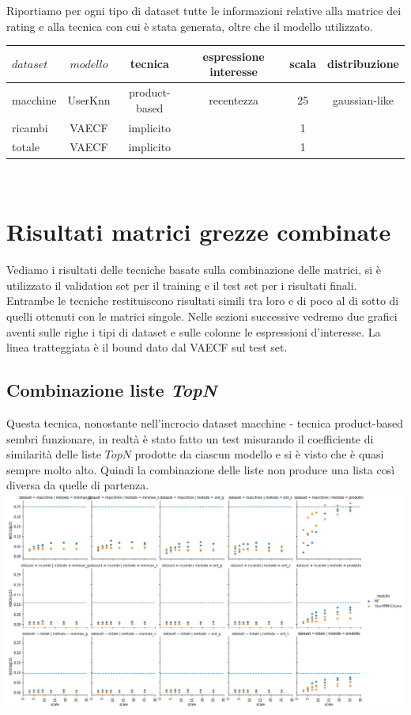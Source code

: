 Riportiamo per ogni tipo di dataset tutte le informazioni relative alla matrice dei rating e alla tecnica con cui è stata generata, oltre che il modello utilizzato.\\

\begin{tabular}{|l|ccccc|}
    \toprule
    $dataset$  & $modello$ & tecnica &espressione interesse & scala & distribuzione  \\
    \midrule
    macchine & UserKnn& product-based &recentezza & 25 & gaussian-like   \\
    ricambi & VAECF& implicito &  & 1  &    \\
    totale & VAECF& implicito &  &  1 &     \\

\bottomrule
\end{tabular}\\

\newpage
\section{Risultati matrici grezze combinate}
Vediamo i risultati delle tecniche basate sulla combinazione delle matrici, si è utilizzato il validation set per il training e il test set per i risultati finali.
Entrambe le tecniche restituiscono risultati simili tra loro e di poco al di sotto di quelli ottenuti con le matrici singole. Nelle sezioni successive vedremo due grafici aventi sulle righe i tipi di dataset e sulle colonne le espressioni d'interesse. La linea tratteggiata è il bound dato dal VAECF sul test set.

\subsection{Combinazione liste \textit{TopN}}
Questa tecnica, nonostante nell'incrocio dataset macchine - tecnica product-based sembri funzionare, in realtà è stato fatto un test misurando il coefficiente di similarità delle liste $TopN$ prodotte da ciascun modello e si è visto che è quasi sempre molto alto. Quindi la combinazione delle liste non produce una lista così diversa da quelle di partenza.\\

\includegraphics[width=16cm]{figures/comb_1.png}

